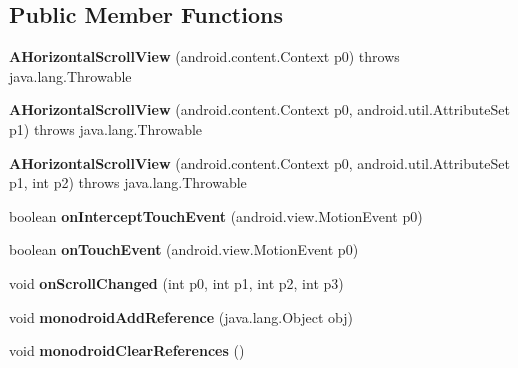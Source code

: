\subsection*{Public Member Functions}
\begin{DoxyCompactItemize}
\item 
\mbox{\label{classmd5b60ffeb829f638581ab2bb9b1a7f4f3f_1_1AHorizontalScrollView_af5243d774c5a226c8d990803ca71be44}} 
{\bfseries A\+Horizontal\+Scroll\+View} (android.\+content.\+Context p0)  throws java.\+lang.\+Throwable 	
\item 
\mbox{\label{classmd5b60ffeb829f638581ab2bb9b1a7f4f3f_1_1AHorizontalScrollView_a152d1e31c4cbb0b713c94c701d37a586}} 
{\bfseries A\+Horizontal\+Scroll\+View} (android.\+content.\+Context p0, android.\+util.\+Attribute\+Set p1)  throws java.\+lang.\+Throwable 	
\item 
\mbox{\label{classmd5b60ffeb829f638581ab2bb9b1a7f4f3f_1_1AHorizontalScrollView_a39296f4d2bb34f96db535ce39d024d99}} 
{\bfseries A\+Horizontal\+Scroll\+View} (android.\+content.\+Context p0, android.\+util.\+Attribute\+Set p1, int p2)  throws java.\+lang.\+Throwable 	
\item 
\mbox{\label{classmd5b60ffeb829f638581ab2bb9b1a7f4f3f_1_1AHorizontalScrollView_a316c95b751f0a5c1adea69370d5325f2}} 
boolean {\bfseries on\+Intercept\+Touch\+Event} (android.\+view.\+Motion\+Event p0)
\item 
\mbox{\label{classmd5b60ffeb829f638581ab2bb9b1a7f4f3f_1_1AHorizontalScrollView_aa8fe4de3af4981fca3ea1efa4d423798}} 
boolean {\bfseries on\+Touch\+Event} (android.\+view.\+Motion\+Event p0)
\item 
\mbox{\label{classmd5b60ffeb829f638581ab2bb9b1a7f4f3f_1_1AHorizontalScrollView_a308c3a91c514c6d38d0b97ea55e0e988}} 
void {\bfseries on\+Scroll\+Changed} (int p0, int p1, int p2, int p3)
\item 
\mbox{\label{classmd5b60ffeb829f638581ab2bb9b1a7f4f3f_1_1AHorizontalScrollView_ab9c83144693d24a7290a699e37f9d99d}} 
void {\bfseries monodroid\+Add\+Reference} (java.\+lang.\+Object obj)
\item 
\mbox{\label{classmd5b60ffeb829f638581ab2bb9b1a7f4f3f_1_1AHorizontalScrollView_ad7c4b2bdd6ed74674575ab60c82d8e0c}} 
void {\bfseries monodroid\+Clear\+References} ()
\end{DoxyCompactItemize}
